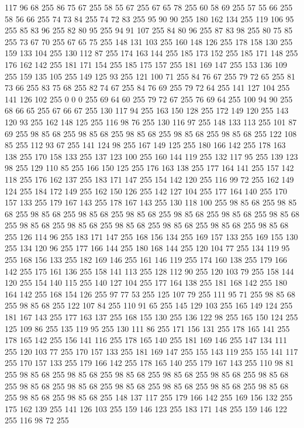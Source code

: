 117 96 68 255 86 75 67 255 58 55 67 255 67 65 78 255 60 58 69 255 57 55 66 255 58 56 66 255 74 73 84 255 74 72 83 255 95 90 90 255 180 162 134 255 119 106 95 255 85 83 96 255 82 80 95 255 94 91 107 255 84 80 96 255 87 83 98 255 80 75 85 255 73 67 70 255 67 65 75 255 148 131 103 255 160 148 126 255 178 158 130 255 159 133 104 255 130 112 87 255 174 163 144 255 185 173 152 255 185 171 148 255 176 162 142 255 181 171 154 255 185 175 157 255 181 169 147 255 153 136 109 255 159 135 105 255 149 125 93 255 121 100 71 255 84 76 67 255 79 72 65 255 81 73 66 255 83 75 68 255 82 74 67 255 84 76 69 255 79 72 64 255 141 127 104 255 141 126 102 255 0 0 0 255 69 64 60 255 79 72 67 255 76 69 64 255 100 94 90 255 68 66 65 255 67 66 67 255 130 117 94 255 163 150 128 255 172 149 120 255 143 120 93 255 162 148 125 255 116 98 76 255 130 116 97 255 148 133 113 255 101 87 69 255 98 85 68 255 98 85 68 255 98 85 68 255
98 85 68 255 98 85 68 255 122 108 85 255 112 93 67 255 141 124 98 255 167 149 125 255 180 166 142 255 178 163 138 255 170 158 133 255 137 123 100 255 160 144 119 255 132 117 95 255 139 123 98 255 129 110 85 255 166 150 125 255 176 163 138 255 177 164 141 255 157 142 118 255 176 162 137 255 183 171 147 255 154 142 120 255 116 99 72 255 162 149 124 255 184 172 149 255 162 150 126 255 142 127 104 255 177 164 140 255 170 157 133 255 179 167 143 255 178 167 143 255 130 118 100 255 98 85 68 255 98 85 68 255 98 85 68 255 98 85 68 255 98 85 68 255 98 85 68 255 98 85 68 255 98 85 68 255 98 85 68 255 98 85 68 255 98 85 68 255 98 85 68 255 98 85 68 255 98 85 68 255 126 114 96 255 183 171 147 255 168 156 134 255 169 157 133 255 169 155 130 255 134 120 96 255 177 166 144 255 180 168 144 255 120 104 77 255 134 119 95 255 168 156 133 255 182 169 146 255 161 146 119 255 174 160 138 255 179 166 142 255 175 161 136 255 158 141 113 255 128 112 90 255 120 103 79 255
158 144 120 255 154 140 115 255 140 127 104 255 177 164 138 255 181 168 142 255 180 164 142 255 168 154 126 255 97 77 53 255 125 107 79 255 111 95 71 255 98 85 68 255 98 85 68 255 122 107 84 255 110 91 65 255 145 129 103 255 165 149 124 255 181 167 143 255 177 163 137 255 168 155 130 255 136 122 98 255 165 150 124 255 125 109 86 255 135 119 95 255 130 111 86 255 171 156 131 255 178 165 141 255 178 165 142 255 156 141 116 255 178 165 140 255 181 169 146 255 147 134 111 255 120 103 77 255 170 157 133 255 181 169 147 255 155 143 119 255 155 141 117 255 170 157 133 255 179 166 142 255 178 165 140 255 179 167 143 255 110 98 81 255 98 85 68 255 98 85 68 255 98 85 68 255 98 85 68 255 98 85 68 255 98 85 68 255 98 85 68 255 98 85 68 255 98 85 68 255 98 85 68 255 98 85 68 255 98 85 68 255 98 85 68 255 98 85 68 255 148 137 117 255 179 166 142 255 169 156 132 255 175 162 139 255 141 126 103 255 159 146 123 255 183 171 148 255 159 146 122 255 116 98 72 255
